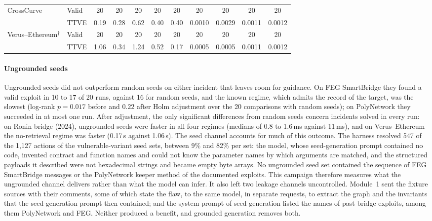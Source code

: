 \documentclass[a4paper]{cas-sc}
\begin{document}
\begin{table}[pos=t,belowcap=4pt]
\begin{tabular*}{\textwidth}{@{\extracolsep{\fill}}llccccccccc@{}}
CrossCurve                  & Valid & 20     & 20     & 20     & 20     & 20     & 20     & 20     & 20     & 20     \\
                            & TTVE  & 0.19   & 0.28   & 0.62   & 0.40   & 0.40   & 0.0010 & 0.0029 & 0.0011 & 0.0012 \\
\addlinespace[2pt]
Verus--Ethereum$^{\dagger}$ & Valid & 20     & 20     & 20     & 20     & 20     & 20     & 20     & 20     & 20     \\
                            & TTVE  & 1.06   & 0.34   & 1.24   & 0.52   & 0.17   & 0.0005 & 0.0005 & 0.0011 & 0.0012 \\
\bottomrule
\end{tabular*}
\end{table}

\paragraph{Ungrounded seeds}
Ungrounded seeds did not outperform random seeds on either incident that leaves room for guidance. On FEG SmartBridge they found a valid exploit in 10 to 17 of 20 runs, against 16 for random seeds, and the known regime, which admits the record of the target, was the slowest (log-rank $p=0.017$ before and $0.22$ after Holm adjustment over the 20 comparisons with random seeds); on PolyNetwork they succeeded in at most one run. After adjustment, the only significant differences from random seeds concern incidents solved in every run: on Ronin bridge (2024), ungrounded seeds were faster in all four regimes (medians of 0.8 to 1.6\,ms against 11\,ms), and on Verus--Ethereum the no-retrieval regime was faster (0.17\,s against 1.06\,s). The seed channel accounts for much of this outcome. The harness resolved 547 of the 1,127 actions of the vulnerable-variant seed sets, between 9\% and 82\% per set: the model, whose seed-generation prompt contained no code, invented contract and function names and could not know the parameter names by which arguments are matched, and the structured payloads it described were not hexadecimal strings and became empty byte arrays. No ungrounded seed set contained the sequence of FEG SmartBridge messages or the PolyNetwork keeper method of the documented exploits. This campaign therefore measures what the ungrounded channel delivers rather than what the model can infer. It also left two leakage channels uncontrolled. Module~1 sent the fixture sources with their comments, some of which state the flaw, to the same model, in separate requests, to extract the graph and the invariants that the seed-generation prompt then contained; and the system prompt of seed generation listed the names of past bridge exploits, among them PolyNetwork and FEG. Neither produced a benefit, and grounded generation removes both.
\end{document}
